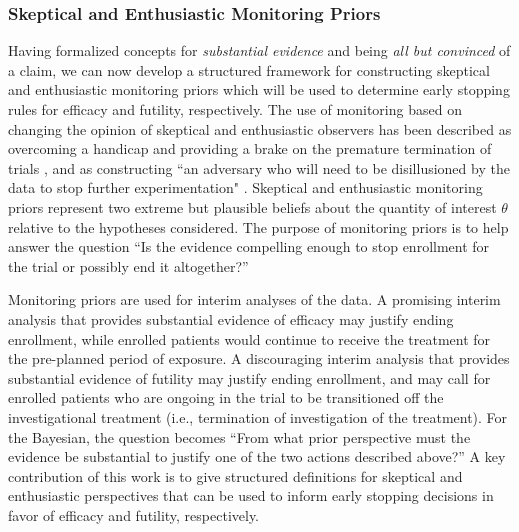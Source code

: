 \documentclass[useAMS,usenatbib,referee]{biom}
\begin{document}
\subsubsection{Skeptical and Enthusiastic Monitoring Priors}\label{sec:MP}
Having formalized concepts for \textit{substantial evidence} and  being \textit{all but convinced} of a claim, 
we can now develop a structured framework for constructing skeptical and enthusiastic monitoring priors which will be used to 
determine early stopping rules for efficacy and futility, respectively.
%
The use of monitoring based on changing the opinion of skeptical and enthusiastic observers has been described as overcoming a 
handicap \citep{Freedman1989} and providing a brake on the premature termination of trials \citep{Fayers1997}, and as 
constructing ``an adversary who will need to be disillusioned by the data to stop further experimentation" \citep{Spiegelhalter1994}. 
%
Skeptical and enthusiastic monitoring priors represent two extreme but plausible beliefs about the quantity of interest $\theta$ relative to the hypotheses considered.
%
The purpose of monitoring priors is to help answer the question ``Is the evidence compelling enough to stop enrollment for the trial or possibly end it altogether?''

Monitoring priors are used for interim analyses of the data. 
A promising interim analysis that provides substantial evidence of efficacy may justify ending enrollment, while enrolled patients would continue 
to receive the treatment for the pre-planned period of exposure. 
%
A discouraging interim analysis that provides substantial evidence of futility may justify ending enrollment, and may call for enrolled patients 
who are ongoing in the trial to be transitioned off the investigational treatment (i.e., termination of investigation of the treatment). 
%
For the Bayesian, the question becomes ``From what prior perspective must the evidence be substantial to justify one of the two actions described above?''
%
A key contribution of this work is to give structured definitions for skeptical and enthusiastic perspectives that can be used 
to inform early stopping decisions in favor of efficacy and futility, respectively.
\end{document}
